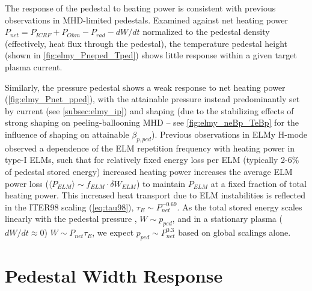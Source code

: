 The response of the pedestal to heating power is consistent with previous observations in MHD-limited pedestals.  Examined against net heating power $P_{net} = P_{ICRF} + P_{Ohm} - P_{rad} - dW/dt$ normalized to the pedestal density (effectively, heat flux through the pedestal), the temperature pedestal height (shown in \cref{fig:elmy_Pneped_Tped}) shows little response within a given target plasma current.  

Similarly, the pressure pedestal shows a weak response to net heating power (\cref{fig:elmy_Pnet_pped}), with the attainable pressure instead predominantly set by current (see \cref{subsec:elmy_ip}) and shaping (due to the stabilizing effects of strong shaping on peeling-ballooning MHD -- see \cref{fig:elmy_neBp_TeBp} for the influence of shaping on attainable $\beta_{p,ped}$).  Previous observations in ELMy H-mode observed a dependence of the ELM repetition frequency with heating power in type-I ELMs, such that for relatively fixed energy loss per ELM (typically 2-6\% of pedestal stored energy) increased heating power increases the average ELM power loss ($\langle P_{ELM} \rangle \sim f_{ELM} \cdot \delta W_{ELM}$) to maintain $P_{ELM}$ at a fixed fraction of total heating power.  This increased heat transport due to ELM instabilities is reflected in the ITER98 scaling (\cref{eq:tau98}), $\tau_E \sim P_{net}^{-0.69}$.  As the total stored energy scales linearly with the pedestal pressure \cite{Kinsey2011}, $W \sim p_{ped}$, and in a stationary plasma ($dW/dt \approx 0$) $W \sim P_{net} \tau_E$, we 
expect $p_{ped} \sim P_{net}^{0.3}$ based on global scalings alone.\nicesectionending

\section{Pedestal Width Response}\label{sec:elmy_width}

\begin{figure}
 \pushtooutside
\end{figure}

